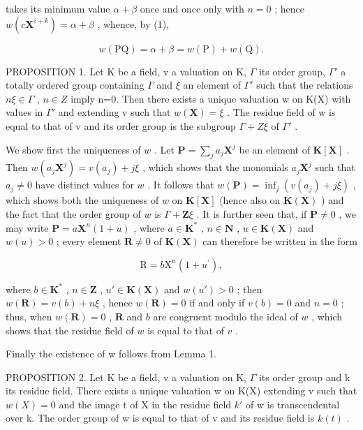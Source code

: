 takes its minimum value \(\alpha + \beta\) once and once only with \(n = 0\) ; hence \(w(c\mathbf{X}^{i + k}) = \alpha + \beta\) , whence, by (1),

\[
w (\mathrm{PQ}) = \alpha + \beta = w (\mathrm{P}) + w (\mathrm{Q}).
\]

PROPOSITION 1. Let K be a field, v a valuation on K, \(\Gamma\) its order group, \(\Gamma'\) a totally ordered group containing \(\Gamma\) and \(\xi\) an element of \(\Gamma'\) such that the relations \(n\xi\in\Gamma\) , \(n\in Z\) imply n=0. Then there exists a unique valuation w on K(X) with values in \(\Gamma'\) and extending v such that \(w(\mathbf{X})=\xi\) . The residue field of w is equal to that of v and its order group is the subgroup \(\Gamma+Z\xi\) of \(\Gamma'\) .

We show first the uniqueness of \(w\) . Let \(\mathbf{P} = \sum_{j} a_j \mathbf{X}^j\) be an element of \(\mathbf{K}[\mathbf{X}]\) . Then \(w(a_j \mathbf{X}^j) = v(a_j) + j\xi\) , which shows that the monomials \(a_j \mathbf{X}^j\) such that \(a_j \neq 0\) have distinct values for \(w\) . It follows that \(w(\mathbf{P}) = \inf_j (v(a_j) + j\xi)\) , which shows both the uniqueness of \(w\) on \(\mathbf{K}[\mathbf{X}]\) (hence also on \(\mathbf{K}(\mathbf{X})\) ) and the fact that the order group of \(w\) is \(\Gamma + \mathbf{Z}\xi\) . It is further seen that, if \(\mathbf{P} \neq 0\) , we may write \(\mathbf{P} = a\mathbf{X}^n (1 + u)\) , where \(a\in \mathbf{K}^*\) , \(n\in \mathbf{N}\) , \(u\in \mathbf{K}(\mathbf{X})\) and \(w(u) > 0\) ; every element \(\mathbf{R}\neq 0\) of \(\mathbf{K}(\mathbf{X})\) can therefore be written in the form

\[
\mathrm{R} = b \mathrm{X} ^ {n} (1 + u ^ {\prime}),
\]

where \(b \in \mathbf{K}^*\) , \(n \in \mathbf{Z}\) , \(u' \in \mathbf{K}(\mathbf{X})\) and \(w(u') > 0\) ; then \(w(\mathbf{R}) = v(b) + n\xi\) , hence \(w(\mathbf{R}) = 0\) if and only if \(v(b) = 0\) and \(n = 0\) ; thus, when \(w(\mathbf{R}) = 0\) , \(\mathbf{R}\) and \(b\) are congruent modulo the ideal of \(w\) , which shows that the residue field of \(w\) is equal to that of \(v\) .

Finally the existence of w follows from Lemma 1.

PROPOSITION 2. Let K be a field, v a valuation on K, \(\Gamma\) its order group and k its residue field. There exists a unique valuation w on K(X) extending v such that \(w(X) = 0\) and the image t of X in the residue field \(k'\) of w is transcendental over k. The order group of w is equal to that of v and its residue field is \(k(t)\) .

